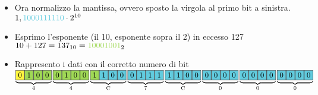 \documentclass[a4paper, 12pt]{article} %
\begin{document}
\begin{itemize}

\item \textsf{\normalsize{Ora normalizzo la mantissa, ovvero sposto la virgola al primo bit a sinistra.}} \\

\centering $ 1,\color{SkyBlue}1000111110\normalcolor \cdot 2^{10} $ \\

\item \flushleft\textsf{\normalsize{Esprimo l'esponente (il 10, esponente sopra il 2) in eccesso 127}} \\

\centering $ 10 + 127 = 137_{10} = \color{LimeGreen!75}10001001\normalcolor_2 $ \\

\item \flushleft\textsf{\normalsize{Rappresento i dati con il corretto numero di bit}} \\




$\underbrace{\fcolorbox{black}{yellow!75}{0} 
\fcolorbox{black}{LimeGreen!75}{1} \fcolorbox{black}{LimeGreen!75}{0} \fcolorbox{black}{LimeGreen!75}{0}} _{4} \underbrace{\fcolorbox{black}{LimeGreen!75}{0} \fcolorbox{black}{LimeGreen!75}{1} \fcolorbox{black}{LimeGreen!75}{0}
\fcolorbox{black}{LimeGreen!75}{0}} _{4} \underbrace{\fcolorbox{black}{LimeGreen!75}{1}
\fcolorbox{black}{SkyBlue}{1} \fcolorbox{black}{SkyBlue}{0}
\fcolorbox{black}{SkyBlue}{0}} _{\text{C}} \underbrace{\fcolorbox{black}{SkyBlue}{0}
\fcolorbox{black}{SkyBlue}{1} \fcolorbox{black}{SkyBlue}{1}
\fcolorbox{black}{SkyBlue}{1}} _{7} \underbrace{\fcolorbox{black}{SkyBlue}{1}
\fcolorbox{black}{SkyBlue}{1} \fcolorbox{black}{SkyBlue}{0}
\fcolorbox{black}{SkyBlue}{0}} _{\text{C}} \underbrace{\fcolorbox{black}{SkyBlue}{0}
\fcolorbox{black}{SkyBlue}{0} \fcolorbox{black}{SkyBlue}{0}
\fcolorbox{black}{SkyBlue}{0}} _{0} \underbrace{\fcolorbox{black}{SkyBlue}{0}
\fcolorbox{black}{SkyBlue}{0} \fcolorbox{black}{SkyBlue}{0}
\fcolorbox{black}{SkyBlue}{0}} _{0} \underbrace{\fcolorbox{black}{SkyBlue}{0}
\fcolorbox{black}{SkyBlue}{0} \fcolorbox{black}{SkyBlue}{0}
\fcolorbox{black}{SkyBlue}{0}} _{0}$ \quad


\end{itemize}
\end{document}

